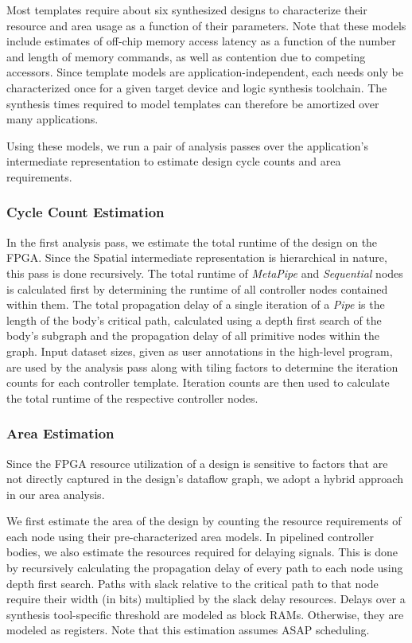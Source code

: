 Most templates require about six synthesized designs to characterize their resource and area usage as a function of their parameters. Note that these models include estimates of off-chip memory access latency as a function of the
number and length of memory commands, as well as contention due to competing accessors. Since template models are application-independent, each needs only be characterized once for a given target device and logic synthesis toolchain. The synthesis times required to model templates can therefore be amortized over many applications.

Using these models, we run a pair of analysis passes over the application's intermediate representation to estimate design cycle counts and area requirements.

\subsubsection{Cycle Count Estimation}
In the first analysis pass, we estimate the total runtime of the design on the FPGA.
Since the Spatial intermediate representation is hierarchical in nature, this pass is done recursively.
The total runtime of \emph{MetaPipe} and \emph{Sequential} nodes is calculated first by determining
the runtime of all controller nodes contained within them. The total propagation delay of a single
iteration of a \emph{Pipe} is the length of the body's critical path, calculated using a depth first
search of the body's subgraph and the propagation delay of all primitive nodes within the graph.
Input dataset sizes, given as user annotations in the high-level program, are used by the analysis pass
along with tiling factors to determine the iteration counts for each controller template.
Iteration counts are then used to calculate the total runtime of the respective controller nodes.


\subsubsection{Area Estimation}
Since the FPGA resource utilization of a design is sensitive to factors that are not directly captured
in the design's dataflow graph, we adopt a hybrid approach in our area analysis.

We first estimate the area of the design by counting the resource
requirements of each node using their pre-characterized area models. In pipelined controller bodies, we also
estimate the resources required for delaying signals. This is done by recursively calculating the
propagation delay of every path to each node using depth first search. Paths with slack relative to
the critical path to that node require their width (in bits) multiplied by the slack delay resources.
Delays over a synthesis tool-specific threshold are modeled as block RAMs.
Otherwise, they are modeled as registers. Note that this estimation assumes ASAP scheduling.

